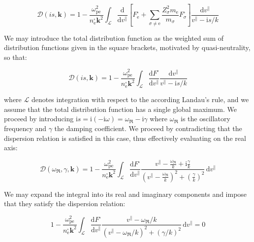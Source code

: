 \begin{equation}
    \mathcal{D}(is,\mathbf{k})=1-\frac{\omega_\text{pe}^2}{n_\text{e}^\square\mathbf{k}^2}\int_\mathcal{L}\frac{\mathrm{d}}{\mathrm{d}v^\parallel}\left[F_\text{e}^\square+\sum_{\sigma\neq\text{e}}\frac{Z_\sigma^2m_\text{e}}{m_\sigma}F_\sigma^\square\right]\frac{\mathrm{d}v^\parallel}{v^\parallel-\mathrm{i}s/k}
\end{equation}

We may introduce the total distribution function as the weighted sum of distribution functions given in the square brackets, motivated by quasi-neutrality, so that:

\begin{equation}
    \mathcal{D}(is,\mathbf{k})=1-\frac{\omega_\text{pe}^2}{n_\text{e}^\square\mathbf{k}^2}\int_{\mathcal{L}}\frac{\mathrm{d}F^\square}{\mathrm{d}v^\parallel}\frac{\mathrm{d}v^\parallel}{v^\parallel-\mathrm{i}s/k}
\end{equation}

where $\mathcal{L}$ denotes integration with respect to the according Landau's rule, and we assume that the total distribution function has a single global maximum. We proceed by introducing $\mathrm{i}s=\mathrm{i}(-\mathrm{i}\omega)=\omega_\Re-\mathrm{i}\gamma$ where $\omega_\Re$ is the oscillatory frequency and $\gamma$ the damping coefficient. We proceed by contradicting that the dispersion relation is satisfied in this case, thus effectively evaluating on the real axis:

\begin{equation}
    \mathcal{D}(\omega_\Re,\gamma,\mathbf{k})=1-\frac{\omega_\text{pe}^2}{n_\text{e}^\square\mathbf{k}^2}\int_{\mathcal{L}}\frac{\mathrm{d}F^\square}{\mathrm{d}v^\parallel}\frac{v^\parallel-\frac{\omega_\Re}{k}+\mathrm{i}\frac{\gamma}{k}}{\left(v^\parallel-\frac{\omega_\Re}{k}\right)^2+\left(\frac{\gamma}{k}\right)^2}\,\mathrm{d}v^\parallel
\end{equation}

We may expand the integral into its real and imaginary components and impose that they satisfy the dispersion relation:

\begin{equation}
    1-\frac{\omega_\text{pe}^2}{n_\text{e}^\square\mathbf{k}^2}\int_{\mathcal{L}}\frac{\mathrm{d}F^\square}{\mathrm{d}v^\parallel}\frac{v^\parallel-\omega_\Re/k}{\left(v^\parallel-\omega_\Re/k\right)^2+\left(\gamma/k\right)^2}\,\mathrm{d}v^\parallel=0
\end{equation}

